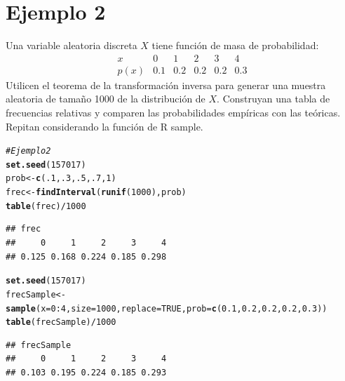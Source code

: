 \documentclass[10pt]{article}\usepackage[]{graphicx}\usepackage[]{xcolor}
\makeatletter
\newcommand{\hlnum}[1]{\textcolor[rgb]{0.686,0.059,0.569}{#1}}%
\newcommand{\hlcom}[1]{\textcolor[rgb]{0.678,0.584,0.686}{\textit{#1}}}%
\newcommand{\hlopt}[1]{\textcolor[rgb]{0,0,0}{#1}}%
\newcommand{\hlstd}[1]{\textcolor[rgb]{0.345,0.345,0.345}{#1}}%
\newcommand{\hlkwb}[1]{\textcolor[rgb]{0.69,0.353,0.396}{#1}}%
\newcommand{\hlkwc}[1]{\textcolor[rgb]{0.333,0.667,0.333}{#1}}%
\newcommand{\hlkwd}[1]{\textcolor[rgb]{0.737,0.353,0.396}{\textbf{#1}}}%
\newenvironment{kframe}{%
 \def\at@end@of@kframe{}%
 \ifinner\ifhmode%
  \def\at@end@of@kframe{\end{minipage}}%
  \begin{minipage}{\columnwidth}%
 \fi\fi%
 \def\FrameCommand##1{\hskip\@totalleftmargin \hskip-\fboxsep
 \colorbox{shadecolor}{##1}\hskip-\fboxsep
     \hskip-\linewidth \hskip-\@totalleftmargin \hskip\columnwidth}%
 \MakeFramed {\advance\hsize-\width
   \@totalleftmargin\z@ \linewidth\hsize
   \@setminipage}}%
 {\par\unskip\endMakeFramed%
 \at@end@of@kframe}
\newenvironment{knitrout}{}{} %
\makeatother
\begin{document}
\section{Ejemplo 2}
Una variable aleatoria discreta $X$ tiene función de masa de probabilidad:
$$
\begin{array}{cccccc}{x} & {0} & {1} & {2} & {3} & {4} \\ \hline p(x) & {0.1} & {0.2} & {0.2} & {0.2} & {0.3}\end{array}
$$
Utilicen el teorema de la transformación inversa para generar una muestra aleatoria de tamaño 1000 de la distribución de $X$. Construyan una tabla de frecuencias relativas y comparen las probabilidades empíricas con las teóricas.\\
Repitan considerando la función de R sample.
\begin{knitrout}
\color{fgcolor}\begin{kframe}
\begin{alltt}
\hlcom{#Ejemplo 2}
\hlkwd{set.seed}\hlstd{(}\hlnum{157017}\hlstd{)}
\hlstd{prob} \hlkwb{<-} \hlkwd{c}\hlstd{(}\hlnum{.1}\hlstd{,}\hlnum{.3}\hlstd{,}\hlnum{.5}\hlstd{,}\hlnum{.7}\hlstd{,}\hlnum{1}\hlstd{)}
\hlstd{frec} \hlkwb{<-} \hlkwd{findInterval}\hlstd{(}\hlkwd{runif}\hlstd{(}\hlnum{1000}\hlstd{),prob)}
\hlkwd{table}\hlstd{(frec)}\hlopt{/}\hlnum{1000}
\end{alltt}
\begin{verbatim}
## frec
##     0     1     2     3     4 
## 0.125 0.168 0.224 0.185 0.298
\end{verbatim}
\begin{alltt}
\hlkwd{set.seed}\hlstd{(}\hlnum{157017}\hlstd{)}
\hlstd{frecSample}\hlkwb{<-}\hlkwd{sample}\hlstd{(}\hlkwc{x}\hlstd{=}\hlnum{0}\hlopt{:}\hlnum{4}\hlstd{,}\hlkwc{size}\hlstd{=}\hlnum{1000}\hlstd{,}\hlkwc{replace} \hlstd{=} \hlnum{TRUE}\hlstd{,}\hlkwc{prob} \hlstd{=} \hlkwd{c}\hlstd{(}\hlnum{0.1}\hlstd{,}\hlnum{0.2}\hlstd{,}\hlnum{0.2}\hlstd{,}\hlnum{0.2}\hlstd{,}\hlnum{0.3}\hlstd{))}
\hlkwd{table}\hlstd{(frecSample)}\hlopt{/}\hlnum{1000}
\end{alltt}
\begin{verbatim}
## frecSample
##     0     1     2     3     4 
## 0.103 0.195 0.224 0.185 0.293
\end{verbatim}
\end{kframe}
\end{knitrout}
\end{document}
